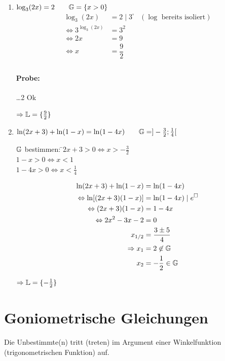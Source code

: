 \clearpage
\Bsps
\begin{enumerate}
	\item $\log_3(2x) = 2\qquad\mathbb{G}=\{x>0\}$
	\begin{align*}
	\log_3(2x) &= 2\mid3^\square &(\log\text{ bereits isoliert})\\
	\Leftrightarrow 3^{\log_3(2x)} &= 3^2\\
	\Leftrightarrow 2x &= 9\\
	\Leftrightarrow x &= \dfrac{9}{2}\\
	\end{align*}
	
	\paragraph{Probe:} \ldots 2 Ok
	
	$\Rightarrow \mathbb{L}=\{\frac{9}{2}\}$
	
	\item $\ln(2x+3)+\ln(1-x) = \ln(1-4x)\qquad\mathbb{G}=]-\frac{3}{2};\frac{1}{4}[$
	
	\begin{tabbing}
		$\mathbb{G}$ bestimmen: \=$2x+3>0\Leftrightarrow x>-\frac{3}{2}$\\
		\>$1-x>0\Leftrightarrow x<1$\\
		\>$1-4x>0\Leftrightarrow x<\frac{1}{4}$\\
	\end{tabbing}
	
	\begin{align*}
	\ln(2x+3)+\ln(1-x) &= \ln(1-4x)\\
	\Leftrightarrow \ln[(2x+3)(1-x)] &= \ln(1-4x)\mid e^\square\\
	\Leftrightarrow (2x+3)(1-x) &= 1-4x\\
	\Leftrightarrow 2x^2-3x-2 &= 0\\
	x_{1/2} &= \dfrac{3\pm5}{4}\\
	\Rightarrow x_1 &= 2\not\in\mathbb{G}\\
	x_2 &= -\frac{1}{2}\in\mathbb{G}\\
	\end{align*}
	
	$\Rightarrow \mathbb{L}=\{-\frac{1}{2}\}$
\end{enumerate}

\clearpage
\section{Goniometrische Gleichungen}
Die Unbestimmte(n) tritt (treten) im Argument einer Winkelfunktion (trigonometrischen Funktion) auf.

